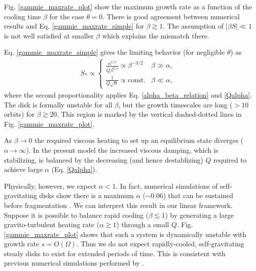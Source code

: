 Fig. \ref{gammie_maxrate_plot} show the maximum growth rate as a
function of the cooling time $\beta$ for the case $\theta=0$. 
There is good agreement between numerical results and
Eq. \ref{gammie_maxrate_simple} for $\beta \gtrsim 1$. The assumption
of $|\beta S|\ll 1$ is not well satisfied at smaller $\beta$ which
explains the mismatch there. 

Eq. \ref{gammie_maxrate_simple} gives the limiting behavior (for
negligible $\theta$) as 
\begin{align*}
  S_*\propto \begin{cases}
    \frac{\alpha^{1/4}}{Q\beta^{3/4}} \propto \beta^{-3/2} &  \beta
    \gg \alpha, \\
    \frac{1}{Q\sqrt{\alpha}}  \propto \mathrm{const.} & \beta \ll \alpha,
  \end{cases}
\end{align*}
where the second proportionality applies Eq. \ref{alpha_beta_relation}
and \ref{Qalpha}. The disk is formally unstable for all $\beta$, but
the growth timescales are long ($>10$ orbits) for $\beta \gtrsim
20$. This region is marked by the vertical dashed-dotted lines in
Fig. \ref{gammie_maxrate_plot}.  


As $\beta\to 0$ the required viscous heating to set up an equilibrium
state diverges ($\alpha\to\infty$). 
In the present model the increased
viscous damping, which is stabilizing, is balanced by the decreasing
(and hence destablizing) $Q$ required to achieve large $\alpha$
(Eq. \ref{Qalpha}). 

Physically, however, we expect $\alpha < 1$. In fact, numerical
simulations of self-gravitating disks show there is a maximum $\alpha$
($\sim 0.06$) that can be sustained before fragmentation
\citep{rice11}. We can interpret this result in our linear framework.
Suppose it is possible to balance rapid cooling ($\beta\lesssim1$) 
by generating a large gravito-turbulent heating rate
($\alpha\gtrsim 1$) through a small $Q$. Fig. \ref{gammie_maxrate_plot} 
shows that such a system is dynamically unstable with 
growth rate $s = O(\Omega)$.  Thus we do not expect rapidly-cooled,
self-gravitating steady disks to exist for extended periods of
time. This is consistent with previous numerical simulations performed
by \cite{lodato05}.   

